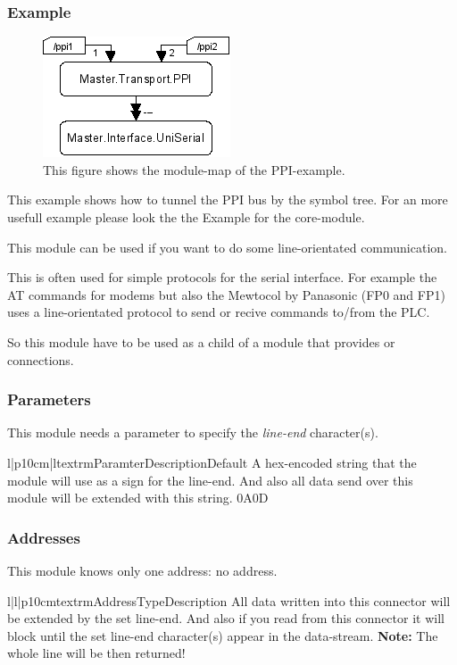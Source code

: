 \subsubsection{Example}
\begin{figure}[ht]
    \label{fig:coremod07}
    \centering
    \includegraphics{coremod07.png}
    \caption{This figure shows the module-map of the PPI-example.}
\end{figure}    
This example shows how to tunnel the PPI bus by the symbol tree. For an more
usefull example please look the the Example for the  core-module.




%
%
This module can be used if you want to do some line-orientated communication.

This is often used for simple protocols for the serial interface. For example
the AT commands for modems but also the Mewtocol by Panasonic (FP0 and FP1) 
uses a line-orientated protocol to send or recive commands to/from the PLC.  

So this module have to be used as a child of a module that provides
 or  connections.

\subsubsection{Parameters}
This module needs a parameter to specify the \emph{line-end} character(s).
\begin{tableiii}{l|p{10cm}|l}{textrm}{Paramter}{Description}{Default}
        {A hex-encoded string that the module will use as a sign for the 
         line-end. And also all data send over this module will be extended
         with this string.}
        {0A0D} 
\end{tableiii}

\subsubsection{Addresses}
This module knows only one address: no address.
\begin{tableiii}{l|l|p{10cm}}{textrm}{Address}{Type}{Description}
\lineiii{---}
        {}
        {All data written into this connector will be extended by the set 
         line-end. And also if you read from this connector it will block 
         until the set line-end character(s) appear in the data-stream.
         \textbf{Note:} The whole line will be then returned!}
\end{tableiii}

